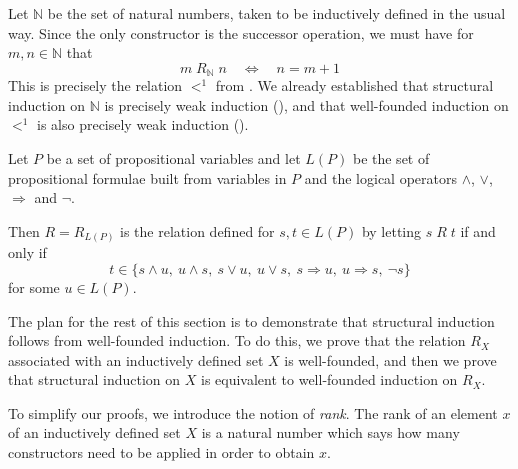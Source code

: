 \begin{example}
Let $\mathbb{N}$ be the set of natural numbers, taken to be inductively defined in the usual way. Since the only constructor is the successor operation, we must have for $m,n \in \mathbb{N}$ that
\[ m\; R_{\mathbb{N}}\; n \quad \Leftrightarrow \quad n=m+1 \]
This is precisely the relation ${<}^1$ from . We already established that structural induction on $\mathbb{N}$ is precisely weak induction (), and that well-founded induction on ${<}^1$ is also precisely weak induction ().
\end{example}

\begin{example}
Let $P$ be a set of propositional variables and let $L(P)$ be the set of propositional formulae built from variables in $P$ and the logical operators $\wedge$, $\vee$, $\Rightarrow$ and $\neg$.

Then $R=R_{L(P)}$ is the relation defined for $s,t \in L(P)$ by letting $s \;R\; t$ if and only if
\[ t \in \{ s \wedge u,\ u \wedge s,\ s \vee u,\ u \vee s,\ s \Rightarrow u,\ u \Rightarrow s,\ \neg s \} \]
for some $u \in L(P)$.
\end{example}

The plan for the rest of this section is to demonstrate that structural induction follows from well-founded induction. To do this, we prove that the relation $R_X$ associated with an inductively defined set $X$ is well-founded, and then we prove that structural induction on $X$ is equivalent to well-founded induction on $R_X$.

To simplify our proofs, we introduce the notion of \textit{rank}. The rank of an element $x$ of an inductively defined set $X$ is a natural number which says how many constructors need to be applied in order to obtain $x$.


